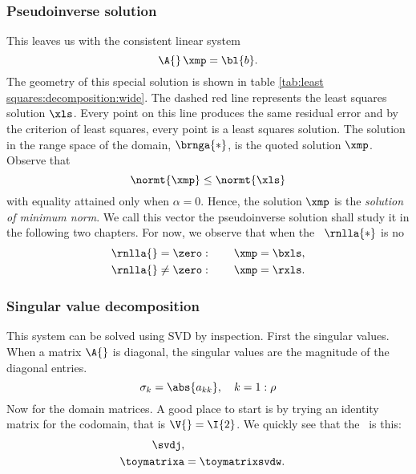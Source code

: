 \subsubsection{Pseudoinverse solution}
This leaves us with the consistent linear system
%
\begin{equation}
  \A{}\, \xmp = {\bl{ b }}.
\end{equation}
The geometry of this special solution is shown in table \eqref{tab:least squares:decomposition:wide}. The dashed red line represents the least squares solution $\xls$. Every point on this line produces the same residual error and by the criterion of least squares, every point is a least squares solution. The solution in the range space of the domain, $\brnga{*}$, is the quoted solution $\xmp$. Observe that
\begin{equation}
  \normt{\xmp} \le \normt{\xls}
\end{equation}
with equality attained only when $\alpha = 0$. Hence, the solution $\xmp$ is the \emph{solution of minimum norm}. We call this vector the pseudoinverse solution shall study it in the following two chapters. For now, we observe that when the \ns\ $\rnlla{*}$ is no
\begin{equation}
  \begin{split}
    \rnlla{} = \zero &: \qquad \xmp = \bxls , \\
    \rnlla{} \ne \zero &: \qquad \xmp = \rxls .
  \end{split}
\end{equation}


\subsubsection{Singular value decomposition}
This system can be solved using SVD by inspection. First the singular values. When a matrix $\A{}$ is diagonal, the singular values are the magnitude of the diagonal entries.
%
\begin{equation}
  \sigma_{k} = \abs{a_{kk}}, \quad k=1:\rho
\end{equation}
%
Now for the domain matrices. A good place to start is by trying an identity matrix for the codomain, that is $\V{} = \I{2}$. We quickly see that the \asvd\ is this:
%
\begin{equation}
  \begin{split}
    \svdj, \\
    \toymatrixa &= \toymatrixsvdw .
  \end{split}
\end{equation}



